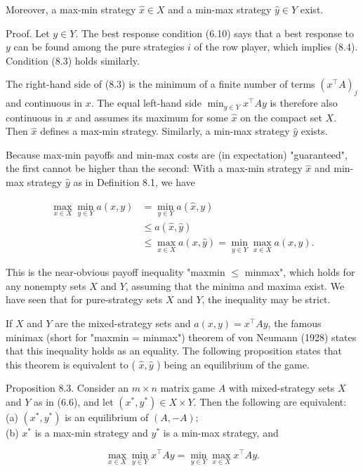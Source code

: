 \documentclass[12pt]{article}
\begin{document}
Moreover, a max-min strategy $\hat{x} \in X$ and a min-max strategy $\hat{y} \in Y$ exist.

Proof. Let $y \in Y$. The best response condition (6.10) says that a best response to $y$ can be found among the pure strategies $i$ of the row player, which implies (8.4). Condition (8.3) holds similarly.

The right-hand side of (8.3) is the minimum of a finite number of terms $\left(x^{\top} A\right)_{j}$ and continuous in $x$. The equal left-hand side $\min _{y \in Y} x^{\top} A y$ is therefore also continuous in $x$ and assumes its maximum for some $\hat{x}$ on the compact set $X$. Then $\hat{x}$ defines a max-min strategy. Similarly, a min-max strategy $\hat{y}$ exists.

Because max-min payoffs and min-max costs are (in expectation) "guaranteed", the first cannot be higher than the second: With a max-min strategy $\hat{x}$ and min-max strategy $\hat{y}$ as in Definition 8.1, we have


\begin{align*}
\max _{x \in X} \min _{y \in Y} a(x, y) & =\min _{y \in Y} a(\hat{x}, y) \\
& \leq a(\hat{x}, \hat{y}) \\
& \leq \max _{x \in X} a(x, \hat{y})=\min _{y \in Y} \max _{x \in X} a(x, y) . \tag{8.5}
\end{align*}


This is the near-obvious payoff inequality "maxmin $\leq$ minmax", which holds for any nonempty sets $X$ and $Y$, assuming that the minima and maxima exist. We have seen that for pure-strategy sets $X$ and $Y$, the inequality may be strict.

If $X$ and $Y$ are the mixed-strategy sets and $a(x, y)=x^{\top} A y$, the famous minimax (short for "maxmin = minmax") theorem of von Neumann (1928) states that this inequality holds as an equality. The following proposition states that this theorem is equivalent to ( $\hat{x}, \hat{y}$ ) being an equilibrium of the game.

Proposition 8.3. Consider an $m \times n$ matrix game $A$ with mixed-strategy sets $X$ and $Y$ as in (6.6), and let $\left(x^{*}, y^{*}\right) \in X \times Y$. Then the following are equivalent:\\
(a) $\left(x^{*}, y^{*}\right)$ is an equilibrium of $(A,-A)$;\\
(b) $x^{*}$ is a max-min strategy and $y^{*}$ is a min-max strategy, and


\begin{equation*}
\max _{x \in X} \min _{y \in Y} x^{\top} A y=\min _{y \in Y} \max _{x \in X} x^{\top} A y . \tag{8.6}
\end{equation*}
\end{document}
